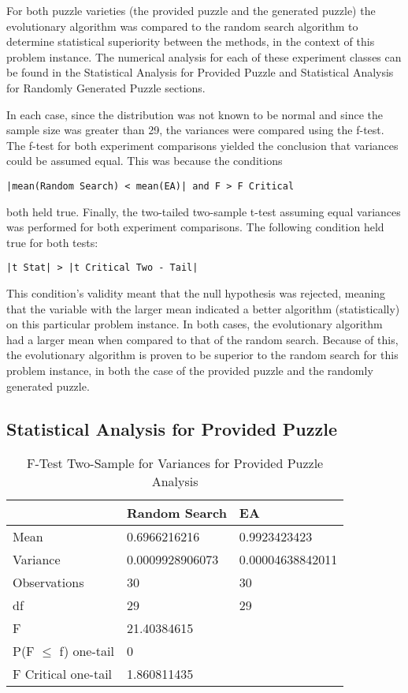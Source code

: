 \documentclass[11pt]{article}
\begin{document}
For both puzzle varieties (the provided puzzle and the generated puzzle) the 
evolutionary algorithm was compared to the random search algorithm to determine 
statistical superiority between the methods, in the context of this problem instance. 
The numerical analysis for each of these experiment classes can be found in the 
Statistical Analysis for Provided Puzzle and Statistical Analysis for Randomly 
Generated Puzzle sections.

In each case, since the distribution was not known to be normal and since the 
sample size was greater than 29, the variances were compared using the f-test. 
The f-test for both experiment comparisons yielded the conclusion that variances 
could be assumed equal. This was because the conditions 

\begin{center}
\texttt{|mean(Random Search) < mean(EA)| and F > F Critical}
\end{center}

both held true. Finally, the two-tailed two-sample t-test assuming equal variances was 
performed for both experiment comparisons. The following condition held true for both 
tests:

\begin{center}
\texttt{|t Stat| > |t Critical Two - Tail|}
\end{center}

This condition's validity meant that the null hypothesis was rejected, meaning that the 
variable with the larger mean indicated a better algorithm (statistically) on this 
particular problem instance. In both cases, the evolutionary algorithm had a 
larger mean when compared to that of the random search. Because of this, the 
evolutionary algorithm is proven to be superior to the random search for this problem 
instance, in both the case of the provided puzzle and the randomly generated puzzle.


\subsection{Statistical Analysis for Provided Puzzle}

\begin{table}[H]
\centering
\caption{F-Test Two-Sample for Variances for Provided Puzzle Analysis}
\label{my-label}
\begin{tabular}{l|l|l}
 & Random Search & EA \\ \hline
Mean & 0.6966216216 & 0.9923423423 \\
Variance & 0.0009928906073 & 0.00004638842011 \\
Observations & 30 & 30 \\
df & 29 & 29 \\
F & 21.40384615 &  \\
P(F $\leq$ f) one-tail & 0 &  \\
F Critical one-tail & 1.860811435 & 
\end{tabular}
\end{table}
\end{document}
